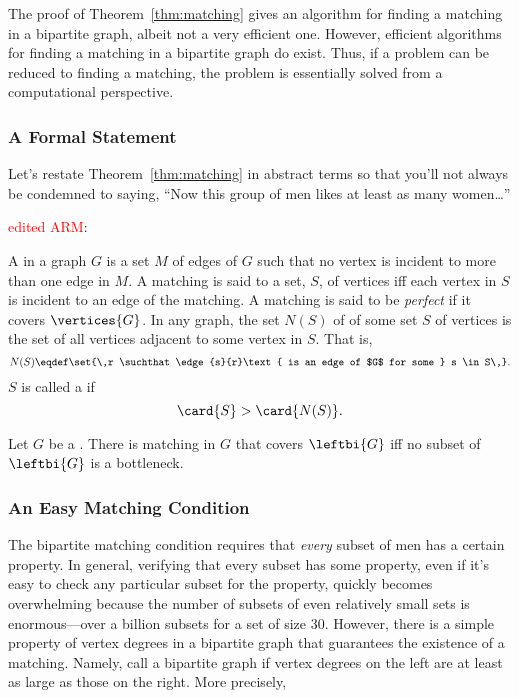 The proof of Theorem~\ref{thm:matching} gives an algorithm for finding
a matching in a bipartite graph, albeit not a very efficient one.
However, efficient algorithms for finding a matching in a bipartite
graph do exist.  Thus, if a problem can be reduced to finding a
matching, the problem is essentially solved from a computational
perspective.

\subsubsection{A Formal Statement}

Let's restate Theorem~\ref{thm:matching} in abstract terms so that
you'll not always be condemned to saying, ``Now this group of men
likes at least as many women\dots''

\begin{definition}\label{def:5K}
\begin{editingnotes}
\textcolor{red}{edited ARM}:
\end{editingnotes}
 A  in a graph $G$ is a set $M$ of
edges of $G$ such that no vertex is incident to more than one edge in $M$.
A matching is said to   
a set, $S$, of vertices iff each vertex in $S$ is incident to an edge of
the matching.  A matching is said to be \emph{perfect}  if it covers $\vertices{G}$.  In any graph,
the set $N(S)$ of  of some set $S$ of vertices is the set
of all vertices adjacent to some vertex in $S$.  That is,
\[
N(S) \eqdef \set{\,r \suchthat \edge{s}{r}\text{ is an edge of $G$ for
    some } s \in S\,}.
\]
$S$ is called a  if
\[
\card{S} > \card{N(S)}.
\]
\end{definition}

\begin{theorem}\label{thm:halls}
  Let $G$ be a .  There is matching in $G$ that
  covers $\leftbi{G}$ iff no subset of $\leftbi{G}$ is a bottleneck.
\end{theorem}

\subsubsection{An Easy Matching Condition}

The bipartite matching condition requires that \emph{every} subset of
men has a certain property.  In general, verifying that every subset
has some property, even if it's easy to check any particular subset
for the property, quickly becomes overwhelming because the number of
subsets of even relatively small sets is enormous---over a billion
subsets for a set of size 30.  However, there is a simple property of
vertex degrees in a bipartite graph that guarantees the existence of a
matching.  Namely, call a bipartite graph 
if vertex degrees on the left are at least as large as those on the
right.  More precisely,

